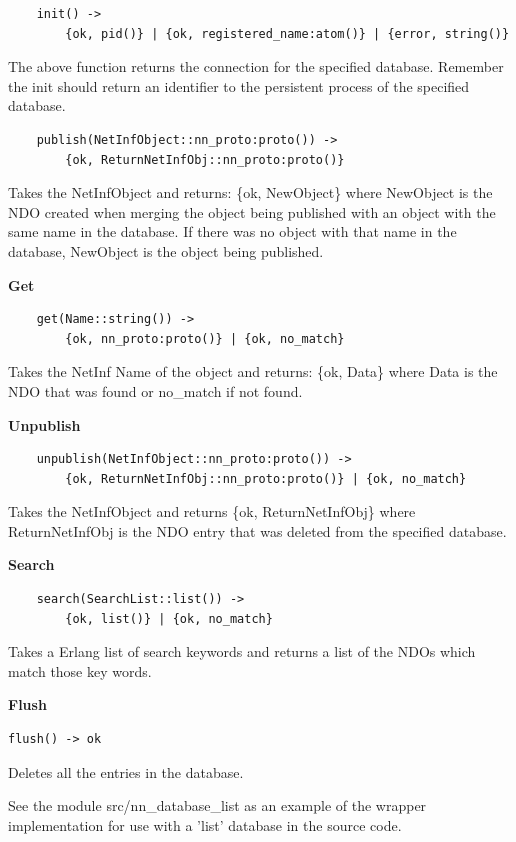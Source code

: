 \begin {verbatim}
    init() -> 
    	{ok, pid()} | {ok, registered_name:atom()} | {error, string()}
\end{verbatim}

The above function returns the connection for the specified database.
Remember the init should return an identifier to the persistent process of the specified database.

\begin {verbatim}
    publish(NetInfObject::nn_proto:proto()) -> 
    	{ok, ReturnNetInfObj::nn_proto:proto()}
\end{verbatim}

Takes the NetInfObject and returns: \{ok, NewObject\} where NewObject is the NDO created when merging the object being published with an object with the same name in the database. If there was no object with that name in the database, NewObject is the object being published.

\textbf{Get}

\begin {verbatim}
    get(Name::string()) -> 
    	{ok, nn_proto:proto()} | {ok, no_match}
\end{verbatim}

Takes the NetInf Name of the object and returns: \{ok, Data\} where Data is the NDO that was found or no\_match if not found.

\textbf{Unpublish}

\begin {verbatim}
    unpublish(NetInfObject::nn_proto:proto()) -> 
    	{ok, ReturnNetInfObj::nn_proto:proto()} | {ok, no_match}
\end{verbatim}

Takes the NetInfObject and returns \{ok, ReturnNetInfObj\} where ReturnNetInfObj is the NDO entry that was deleted from the specified database.

\textbf{Search}

\begin {verbatim}
    search(SearchList::list()) -> 
    	{ok, list()} | {ok, no_match}
\end{verbatim}

Takes a Erlang list of search keywords and returns a list of the NDOs which match those key words.

\textbf{Flush}

\begin{verbatim}
flush() -> ok
\end{verbatim}

Deletes all the entries in the database.   

See the module src/nn\_database\_list as an example of the wrapper implementation for use with a 'list' database in the source code.
